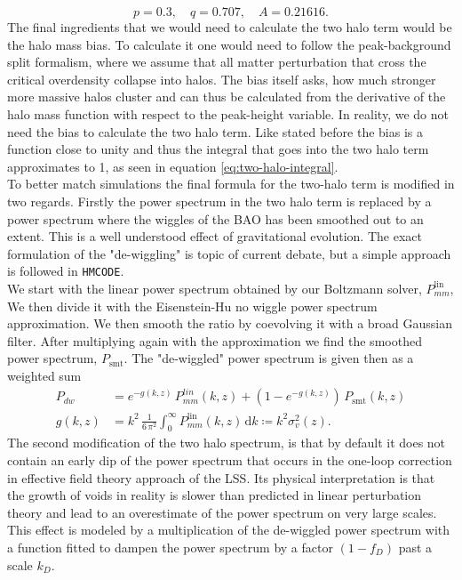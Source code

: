 \documentclass[oneside]{book}
\newcommand*{\rd}{\mathrm{d}}
\newcommand*{\hmcode}{\texttt{HMCODE}\xspace}
\begin{document}
\begin{equation*}
    p=0.3,\quad q=0.707,\quad A=0.21616.
\end{equation*}
The final ingredients that we would need to calculate the two halo term would be the halo mass bias. To calculate it one would need to follow the peak-background split formalism, where we assume that all matter perturbation that cross the critical overdensity collapse into halos. The bias itself asks, how much stronger more massive halos cluster and can thus be calculated from the derivative of the halo mass function with respect to the peak-height variable.
In reality, we do not need the bias to calculate the two halo term. Like stated before the bias is a function close to unity and thus the integral that goes into the two halo term approximates to 1, as seen in equation \ref{eq:two-halo-integral}.\\
To better match simulations the final formula for the two-halo term is modified in two regards. Firstly the power spectrum in the two halo term is replaced by a power spectrum where the wiggles of the BAO has been smoothed out to an extent. This is a well understood effect of gravitational evolution. The exact formulation of the "de-wiggling" is topic of current debate, but a simple approach is followed in \hmcode.\\
 We start with the linear power spectrum obtained by our Boltzmann solver, $P_{mm}^\mathrm{lin}$, We then divide it with the Eisenstein-Hu no wiggle power spectrum approximation. We then smooth the ratio by coevolving it with a broad Gaussian filter. After multiplying again with the approximation we find the smoothed power spectrum, $P_\mathrm{smt}$. The "de-wiggled" power spectrum is given then as a weighted sum\begin{align}
    P_{dw} &= e^{-g(k,z)}\,P^{lin}_{mm}(k,z) + (1-e^{-g(k,z)})\,P_\mathrm{smt}(k,z)\\
 g(k,z) &= k^2\,\frac{1}{6\,\pi^2}\int_0^\infty P^\mathrm{lin}_{mm}(k,z)\,\rd k\coloneqq k^2 \sigma_v^2(z).
 \end{align}
The second modification of the two halo spectrum, is that by default it does not contain an early dip of the power spectrum that occurs in the one-loop correction in effective field theory approach of the LSS. Its physical interpretation is that the growth of voids in reality is slower than predicted in linear perturbation theory and lead to an overestimate of the power spectrum on very large scales. This effect is modeled by a multiplication of the de-wiggled power spectrum with a function fitted to dampen the power spectrum by a factor $(1-f_D)$ past a scale $k_D$.\\
\end{document}

